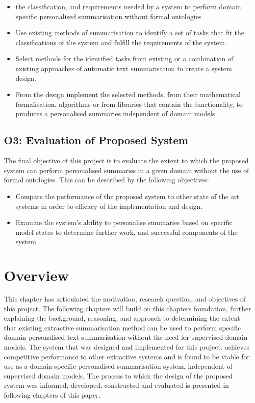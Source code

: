 \begin{itemize}
    \item the classification, and requirements needed by a system to perform domain specific personalised summarisation without formal ontologies
    \item Use existing methods of summarisation to identify a set of tasks that fit the classifications of the system and fulfill the requirements of the system.
    \item Select methods for the identified tasks from existing or a combination of existing approaches of automatic text summarisation to create a system design.
    \item From the design implement the selected methods, from their mathematical formalisation, algorithms or from libraries that contain the functionality, to produces a personalised summaries independent of domain models
\end{itemize}

\subsection*{O3: Evaluation of Proposed System}

The final objective of this project is to evaluate the extent to which the proposed system can perform personalised summaries in a given domain without the use of formal ontologies. This can be described by the following objectives:

\begin{itemize}
    \item Compare the performance of the proposed system to other state of the art systems in order to efficacy of the implementation and design.
    \item Examine the system's ability to personalise summaries based on specific model states to determine further work, and successful components of the system
\end{itemize}

\section{Overview}
This chapter has articulated the motivation, research question, and objectives of this project. The following chapters will build on this chapters foundation, further explaining the background, reasoning, and approach to determining the extent that existing extractive summarisation method can be used to perform specific domain personalised text summarisation without the need for supervised domain models. The system that was designed and implemented for this project, achieves competitive performance to other extractive systems and is found to be viable for use as a domain specific personalised summarisation system, independent of supervised domain models. The process to which the design of the proposed system was informed, developed, constructed and evaluated is presented in following chapters of this paper.

